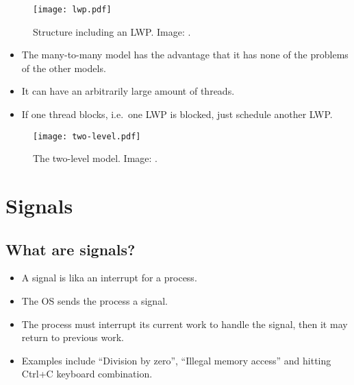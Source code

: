 \documentclass{beamer}
\begin{document}
\begin{frame}{\insertsubsectionhead}
  \begin{figure}
    \texttt{[image: lwp.pdf]}
    \caption{Structure including an LWP.
      Image: \cite{Silberschatz2013osc}.}
  \end{figure}
\end{frame}

\begin{frame}{\insertsubsectionhead}
  \begin{itemize}
    \item The many-to-many model has the advantage that it has none of the 
      problems of the other models.

    \item It can have an arbitrarily large amount of threads.

    \item If one thread blocks, i.e.\ one LWP is blocked, just schedule another 
      LWP.
  \end{itemize}
\end{frame}

\begin{frame}{\insertsubsectionhead}
  \begin{figure}
    \texttt{[image: two-level.pdf]}
    \caption{The two-level model.
      Image: \cite{Silberschatz2013osc}.}
  \end{figure}
\end{frame}

\section{Signals}

\subsection{What are signals?}

\begin{frame}{\insertsubsectionhead}
  \begin{itemize}
    \item A signal is lika an interrupt for a process.

    \item The OS sends the process a signal.

    \item The process must interrupt its current work to handle the signal, 
      then it may return to previous work.

    \item Examples include ``Division by zero'', ``Illegal memory access'' and 
      hitting Ctrl+C keyboard combination.

  \end{itemize}
\end{frame}
\end{document}
